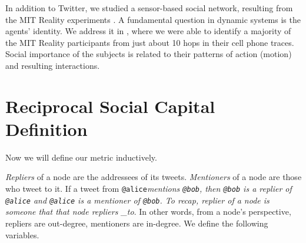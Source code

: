 \documentclass[10pt,oneside]{memoir}
\begin{document}
In addition to Twitter, we studied a sensor-based social network, resulting from the MIT Reality experiments \cite{Eagle:2006:Reality}. A fundamental question in dynamic systems is the agents' identity. We address it in \cite{Khrabrov:2009:Language}, where we were able to identify a majority of the MIT Reality participants from just about 10 hops in their cell phone traces. Social importance of the subjects is related to their patterns of action (motion) and resulting interactions.


\pagebreak \section{Reciprocal Social Capital Definition}
\label{reciprocalsocialcapitaldefinition}

Now we will define our metric inductively.


{\itshape Repliers} of a node are the addressees of its tweets. {\itshape Mentioners} of a node are those who tweet to it. If a tweet from \texttt{@alice}{\itshape mentions \texttt{@bob}, then \texttt{@bob} is a replier of \texttt{@alice} and \texttt{@alice} is a mentioner of \texttt{@bob}. To recap, replier of a node is someone that that node repliers \_to}. In other words, from a node's perspective, repliers are out-degree, mentioners are in-degree.  We define the following variables.
\end{document}
